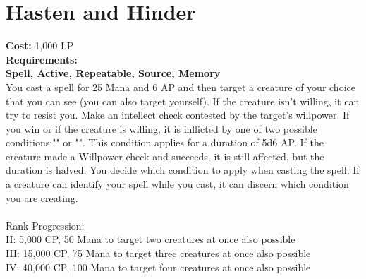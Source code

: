 \section{Hasten and Hinder}\label{spell:hastenHinder}
\textbf{Cost:} 1,000 LP\\
\textbf{Requirements:}\\
\textbf{Spell, Active, Repeatable, Source, Memory}\\
You cast a spell for 25 Mana and 6 AP and then target a creature of your choice that you can see (you can also target yourself).
If the creature isn't willing, it can try to resist you.
Make an intellect check contested by the target's willpower.
If you win or if the creature is willing, it is inflicted by one of two possible conditions:"" or "".
This condition applies for a duration of 5d6 AP.
If the creature made a Willpower check and succeeds, it is still affected, but the duration is halved.
You decide which condition to apply when casting the spell.
If a creature can identify your spell while you cast, it can discern which condition you are creating.\\
\\
Rank Progression:\\
II: 5,000 CP, 50 Mana to target two creatures at once also possible\\
III: 15,000 CP, 75 Mana to target three creatures at once also possible\\
IV: 40,000 CP, 100 Mana to target four creatures at once also possible \\